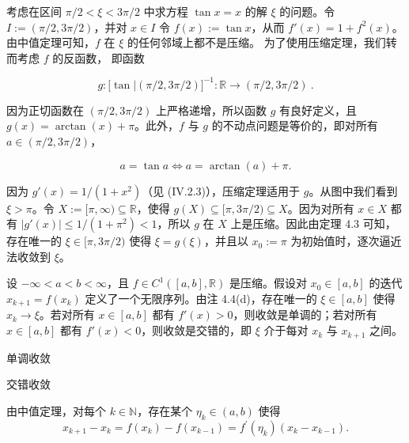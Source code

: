 \begin{example}

\begin{items}
\item

考虑在区间 $\pi/2 < \xi < 3\pi/2$ 中求方程 $\tan x = x$ 的解 $\xi$ 的问题。令 $I := (\pi/2, 3\pi/2)$，并对 $x \in I$ 令 $f(x) := \tan x$，从而 $f'(x) = 1 + f^2(x)$。由中值定理可知，$f$ 在 $\xi$ 的任何邻域上都不是压缩。
为了使用压缩定理，我们转而考虑 $f$ 的反函数，
即函数

\[
g\colon\bigl[\tan\bigl|(\pi/2,3\pi/2)\bigr]^{-1}\colon\mathbb{R}\to(\pi/2,3\pi/2)~.
\]

因为正切函数在 $(\pi/2, 3\pi/2)$ 上严格递增，所以函数 $g$ 有良好定义，且 $g(x) = \arctan(x) + \pi$。此外，$f$ 与 $g$ 的不动点问题是等价的，即对所有 $a \in (\pi/2, 3\pi/2)$，

\end{items}

\[
a=\tan a\Longleftrightarrow a=\arctan(a)+\pi.
\]

因为 $ g'(x) = 1/(1 + x^2) $（见 (IV.2.3)），压缩定理适用于 $ g $。从图中我们看到 $ \xi > \pi $。令 $ X := [\pi, \infty) \subseteq \mathbb{R} $，使得 $ g(X) \subseteq [\pi, 3\pi/2) \subseteq X $。因为对所有 $ x \in X $ 都有 $ |g'(x)| \leq 1/(1 + \pi^2) < 1 $，所以 $ g $ 在 $ X $ 上是压缩。因此由定理 4.3 可知，存在唯一的 $ \xi \in [\pi, 3\pi/2) $ 使得 $ \xi = g(\xi) $，并且以 $ x_0 := \pi $ 为初始值时，逐次逼近法收敛到 $ \xi $。

\begin{items}
\item[（b）]

设 $ -\infty < a < b < \infty $，且 $ f \in C^1([a, b], \mathbb{R}) $ 是压缩。假设对 $ x_0 \in [a, b] $ 的迭代 $ x_{k+1} = f(x_k) $ 定义了一个无限序列。由注 4.4(d)，存在唯一的 $ \xi \in [a, b] $ 使得 $ x_k \to \xi $。若对所有 $ x \in [a, b] $ 都有 $ f'(x) > 0 $，则收敛是单调的；若对所有 $ x \in [a, b] $ 都有 $ f'(x) < 0 $，则收敛是交错的，即 $ \xi $ 介于每对 $ x_k $ 与 $ x_{k+1} $ 之间。

\end{items}


单调收敛


交错收敛

\proofhead
由中值定理，对每个 $ k \in \mathbb{N} $，存在某个 $ \eta_k \in (a, b) $ 使得
\[
x_{k+1}-x_{k}=f(x_{k})-f(x_{k-1})=f^{\prime}(\eta_{k})(x_{k}-x_{k-1}).
\]


\end{example}
